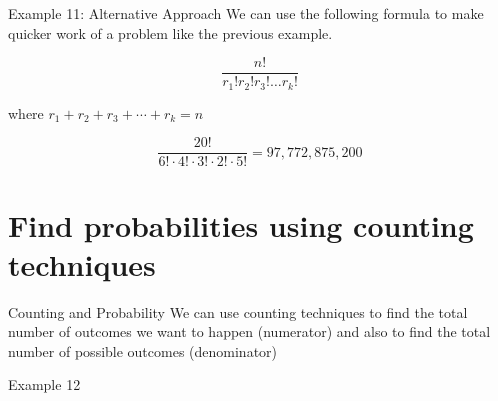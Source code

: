 \documentclass[t]{beamer}
\begin{document}
\begin{frame}{Example 11: Alternative Approach}
We can use the following formula to make quicker work of a problem like the previous example.	\newline\\	\pause

\[ \frac{n!}{r_1!r_2!r_3!\dots r_k!} \]	\bigskip

where $r_1 + r_2 + r_3 + \cdots + r_k = n$	\newline\\	\pause

\[\frac{20!}{6! \cdot 4! \cdot 3! \cdot 2! \cdot 5!} = 97,772,875,200\]
\end{frame}

\section{Find probabilities using counting techniques}

\begin{frame}{Counting and Probability}
We can use counting techniques to find the total number of outcomes we want to happen (numerator) and also to find the total number of possible outcomes (denominator)
\end{frame}

\begin{frame}{Example 12}

\end{frame}
\end{document}
